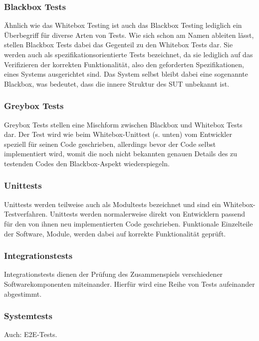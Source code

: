 \subsubsection*{Blackbox Tests}\label{subsubsec:blackbox}
Ähnlich wie das Whitebox Testing ist auch das Blackbox Testing lediglich ein Überbegriff für diverse Arten von Tests. Wie sich schon am Namen ableiten lässt, stellen Blackbox Tests dabei das Gegenteil zu den Whitebox Tests dar. Sie werden auch als spezifikationsorientierte Tests bezeichnet, da sie lediglich auf das Verifizieren der korrekten Funktionalität, also den geforderten Spezifikationen, eines Systems ausgerichtet sind. Das System selbst bleibt dabei eine sogenannte Blackbox, was bedeutet, dass die innere Struktur des \ac{SUT} unbekannt ist. \cite[S. 120f.]{oregan:2019}

\subsubsection*{Greybox Tests}\label{subsubsec:greybox}
Greybox Tests stellen eine Mischform zwischen Blackbox und Whitebox Tests dar. Der Test wird wie beim Whitebox-Unittest (s. unten) vom Entwickler speziell für seinen Code geschrieben, allerdings bevor der Code selbst implementiert wird, womit die noch nicht bekannten genauen Details des zu testenden Codes den Blackbox-Aspekt wiederspiegeln. \cite[S. 86]{witte:2019}

\subsubsection*{Unittests}\label{subsubsec:unittest}
Unittests werden teilweise auch als Modultests bezeichnet und sind ein Whitebox-Testverfahren. Unittests werden normalerweise direkt von Entwicklern passend für den von ihnen neu implementierten Code geschrieben. Funktionale Einzelteile der Software, Module, werden dabei auf korrekte Funktionalität geprüft. \cite[S. 75]{witte:2019}

\subsubsection*{Integrationstests} \label{subsubsec:integrationstests}
Integrationstests dienen der Prüfung des Zusammenspiels verschiedener Softwarekomponenten miteinander. Hierfür wird eine Reihe von Tests aufeinander abgestimmt. \cite[S. 76]{witte:2019}

\subsubsection*{Systemtests}\label{subsubsec:e2etests}
Auch: \ac{E2E}-Tests.

